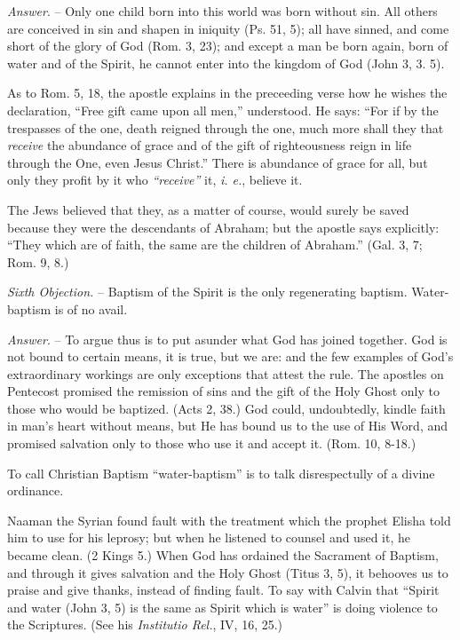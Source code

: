 \documentclass[
]{book}
\begin{document}
\emph{Answer}. -- Only one child born into this world was born without sin. All others are conceived in sin and shapen in iniquity (Ps. 51, 5); all have sinned, and come short of the glory of God (Rom. 3, 23); and except a man be born again, born of water and of the Spirit, he cannot enter into the kingdom of God (John 3, 3. 5).

As to Rom. 5, 18, the apostle explains in the preceeding verse how he wishes the declaration, ``Free gift came upon all men,'' understood. He says: ``For if by the trespasses of the one, death reigned through the one, much more shall they that \emph{receive} the abundance of grace and of the gift of righteousness reign in life through the One, even Jesus Christ.'' There is abundance of grace for all, but only they profit by it who \emph{``receive''} it, \emph{i. e.}, believe it.

The Jews believed that they, as a matter of course, would surely be saved because they were the descendants of Abraham; but the apostle says explicitly: ``They which are of faith, the same are the children of Abraham.'' (Gal. 3, 7; Rom. 9, 8.)

\emph{Sixth Objection.} -- Baptism of the Spirit is the only regenerating baptism. Water-baptism is of no avail.

\emph{Answer}. -- To argue thus is to put asunder what God has joined together. God is not bound to certain means, it is true, but we are: and the few examples of God's extraordinary workings are only exceptions that attest the rule. The apostles on Pentecost promised the remission of sins and the gift of the Holy Ghost only to those who would be baptized. (Acts 2, 38.) God could, undoubtedly, kindle faith in man's heart without means, but He has bound us to the use of His Word, and promised salvation only to those who use it and accept it. (Rom. 10, 8-18.)

To call Christian Baptism ``water-baptism'' is to talk disrespectully of a divine ordinance.

Naaman the Syrian found fault with the treatment which the prophet Elisha told him to use for his leprosy; but when he listened to counsel and used it, he became clean. (2 Kings 5.) When God has ordained the Sacrament of Baptism, and through it gives salvation and the Holy Ghost (Titus 3, 5), it behooves us to praise and give thanks, instead of finding fault. To say with Calvin that ``Spirit and water (John 3, 5) is the same as Spirit which is water'' is doing violence to the Scriptures. (See his \emph{Institutio Rel.}, IV, 16, 25.)
\end{document}
